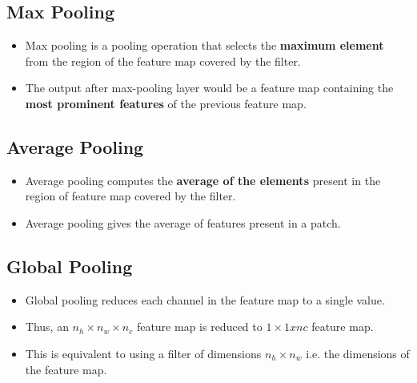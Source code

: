 \subsection{Max Pooling \cite{gfg-cnn-introduction-to-pooling-layer}}\label{cnn: Max Pooling}

\begin{itemize}
    \item Max pooling is a pooling operation that selects the \textbf{maximum element} from the region of the feature map covered by the filter. 
    
    \item The output after max-pooling layer would be a feature map containing the \textbf{most prominent features} of the previous feature map.
\end{itemize}


\subsection{Average Pooling \cite{gfg-cnn-introduction-to-pooling-layer}}\label{cnn: Average Pooling}
\begin{itemize}
    \item Average pooling computes the \textbf{average of the elements} present in the region of feature map covered by the filter.
    
    \item Average pooling gives the average of features present in a patch.
\end{itemize}


\subsection{Global Pooling \cite{gfg-cnn-introduction-to-pooling-layer}}\label{cnn: Global Pooling}
\begin{itemize}
    \item Global pooling reduces each channel in the feature map to a single value.
    
    \item Thus, an $n_h \times n_w \times n_c$ feature map is reduced to $1 \times 1 x nc$ feature map. 

    \item This is equivalent to using a filter of dimensions $n_h \times n_w$ i.e. the dimensions of the feature map.
\end{itemize}

